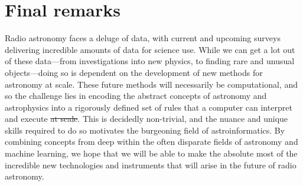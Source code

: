 \documentclass[11pt, a4paper]{book}
\providecommand{\DIFaddtex}[1]{{\protect\color{blue}\uwave{#1}}} %
\providecommand{\DIFdeltex}[1]{{\protect\color{red}\sout{#1}}}                      %
\providecommand{\DIFaddbegin}{} %
\providecommand{\DIFaddend}{} %
\providecommand{\DIFdelbegin}{} %
\providecommand{\DIFdelend}{} %
\providecommand{\DIFadd}[1]{\texorpdfstring{\DIFaddtex{#1}}{#1}} %
\providecommand{\DIFdel}[1]{\texorpdfstring{\DIFdeltex{#1}}{}} %
\newcommand{\DIFscaledelfig}{0.5}
\newlength{\DIFdelgraphicswidth} %
\newlength{\DIFdelgraphicsheight} %
\newcommand{\DIFaddincludegraphics}[2][]{{\color{blue}\fbox{\DIFOincludegraphics[#1]{#2}}}} %
\newcommand{\DIFdelincludegraphics}[2][]{%
\sbox{\DIFdelgraphicsbox}{\DIFOincludegraphics[#1]{#2}}%
\settoboxwidth{\DIFdelgraphicswidth}{\DIFdelgraphicsbox} %
\settoboxtotalheight{\DIFdelgraphicsheight}{\DIFdelgraphicsbox} %
\scalebox{\DIFscaledelfig}{%
\parbox[b]{\DIFdelgraphicswidth}{\usebox{\DIFdelgraphicsbox}\\[-\baselineskip] \rule{\DIFdelgraphicswidth}{0em}}\llap{\resizebox{\DIFdelgraphicswidth}{\DIFdelgraphicsheight}{%
\setlength{\unitlength}{\DIFdelgraphicswidth}%
\begin{picture}(1,1)%
\thicklines\linethickness{2pt} %
{\color[rgb]{1,0,0}\put(0,0){\framebox(1,1){}}}%
{\color[rgb]{1,0,0}\put(0,0){\line( 1,1){1}}}%
{\color[rgb]{1,0,0}\put(0,1){\line(1,-1){1}}}%
\end{picture}%
}\hspace*{3pt}}} %
} %
\DeclareRobustCommand{\DIFaddbegin}{\DIFOaddbegin \let\includegraphics\DIFaddincludegraphics} %
\DeclareRobustCommand{\DIFaddend}{\DIFOaddend \let\includegraphics\DIFOincludegraphics} %
\DeclareRobustCommand{\DIFdelbegin}{\DIFOdelbegin \let\includegraphics\DIFdelincludegraphics} %
\DeclareRobustCommand{\DIFdelend}{\DIFOaddend \let\includegraphics\DIFOincludegraphics} %
\begin{document}

\section{Final remarks}
\label{sec:final-remarks}

    Radio astronomy faces a deluge of data, with current and upcoming surveys delivering incredible amounts of data for science use. While we can get a lot out of these data---from investigations into new physics, to finding rare and unusual objects---doing so is dependent on the development of new methods for astronomy at scale. These future methods will necessarily be computational, and so the challenge lies in encoding the abstract concepts of astronomy and astrophysics into a rigorously defined set of rules that a computer can interpret and execute \DIFdelbegin \DIFdel{at scale}\DIFdelend \DIFaddbegin \DIFadd{en masse}\DIFaddend . This is decidedly non-trivial, and the nuance and unique skills required to do so motivates the burgeoning field of astroinformatics. By combining concepts from deep within the often disparate fields of astronomy and machine learning, we hope that we will be able to make the absolute most of the incredible new technologies and instruments that will arise in the future of radio astronomy.



\end{document}
